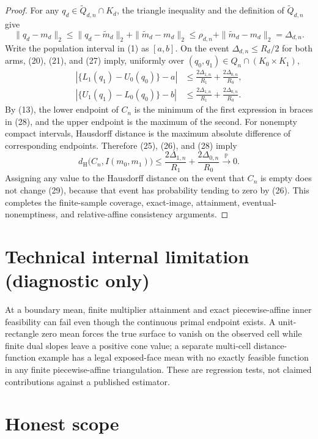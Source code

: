 \documentclass{article}
\begin{document}
\begin{proof}
For any \(q_d\in\widetilde Q_{d,n}\cap K_d\), the triangle inequality and the definition of \(\widetilde Q_{d,n}\) give
\[
 \|q_d-m_d\|_2
 \leq\|q_d-\widetilde m_d\|_2+\|\widetilde m_d-m_d\|_2
 \leq\rho_{d,n}+\|\widetilde m_d-m_d\|_2
 =\Delta_{d,n}.                                             \tag{27}
\]
Write the population interval in (1) as \([a,b]\).  On the event \(\Delta_{d,n}\leq R_d/2\) for both arms, (20), (21), and (27) imply, uniformly over \((q_0,q_1)\in Q_n\cap(K_0\times K_1)\),
\[
\begin{aligned}
 |\{L_1(q_1)-U_0(q_0)\}-a|
 &\leq \frac{2\Delta_{1,n}}{R_1}+\frac{2\Delta_{0,n}}{R_0},\\
 |\{U_1(q_1)-L_0(q_0)\}-b|
 &\leq \frac{2\Delta_{1,n}}{R_1}+\frac{2\Delta_{0,n}}{R_0}. \tag{28}
\end{aligned}
\]
By (13), the lower endpoint of \(C_n\) is the minimum of the first expression in braces in (28), and the upper endpoint is the maximum of the second.  For nonempty compact intervals, Hausdorff distance is the maximum absolute difference of corresponding endpoints.  Therefore (25), (26), and (28) imply
\[
 d_{\mathrm H}\bigl(C_n,I(m_0,m_1)\bigr)
 \leq\frac{2\Delta_{1,n}}{R_1}+\frac{2\Delta_{0,n}}{R_0}
 \xrightarrow{\mathbb P}0.                                \tag{29}
\]
Assigning any value to the Hausdorff distance on the event that \(C_n\) is empty does not change (29), because that event has probability tending to zero by (26).  This completes the finite-sample coverage, exact-image, attainment, eventual-nonemptiness, and relative-affine consistency arguments.
\end{proof}

\section*{Technical internal limitation (diagnostic only)}

At a boundary mean, finite multiplier attainment and exact piecewise-affine inner feasibility can fail even though the continuous primal endpoint exists. A unit-rectangle zero mean forces the true surface to vanish on the observed cell while finite dual slopes leave a positive cone value; a separate multi-cell distance-function example has a legal exposed-face mean with no exactly feasible function in any finite piecewise-affine triangulation. These are regression tests, not claimed contributions against a published estimator.

\section{Honest scope}
\end{document}
